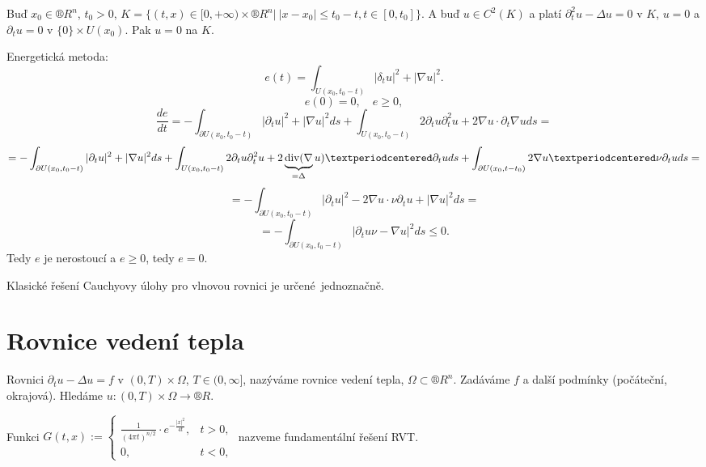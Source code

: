 \documentclass[12pt]{article}					%
\begin{document}

\begin{veta}
	Buď $x_0 \in ®R^n$, $t_0 > 0$, $K = \{(t, x) \in [0, +∞) \times ®R^n |\ |x - x_0| ≤ t_0 - t, t \in [0, t_0]\}$. A buď $u \in C^2(K)$ a platí $\partial_t^2 u - \Delta u = 0$ v $K$, $u = 0$ a $\partial_t u = 0$ v $\{0\} \times U(x_0)$. Pak $u = 0$ na $K$.

	\begin{dukazin}
		Energetická metoda:
		$$ e(t) = \int_{U(x_0, t_0 - t)} |\delta_t u|^2 + |\nabla u|^2. $$
		$$ e(0) = 0, \quad e ≥ 0, $$
		$$ \frac{de}{dt} = - \int_{\partial U(x_0, t_0 - t)}|\partial_t u|^2 + |\nabla u|^2 ds + \int_{U(x_0, t_0 - t)} 2 \partial_t u \partial_t^2 u + 2 \nabla u · \partial_t \nabla u ds = $$
		$$ = - \int_{\partial U(x_0, t_0 - t)}|\partial_t u|^2 + |\nabla u|^2 ds + \int_{U(x_0, t_0 - t)} 2 \partial_t u \partial_t^2 u + 2 \underbrace{\Div(\nabla}_{=\Delta} u) · \partial_t u ds + \int_{\partial U(x_0, t - t_0)} 2 \nabla u·\nu \partial_t u ds = $$
		$$ = - \int_{\partial U(x_0, t_0 - t)}|\partial_t u|^2 - 2\nabla u · \nu \partial_t u + |\nabla u|^2 ds = $$
		$$ = - \int_{\partial U(x_0, t_0 - t)}|\partial_t u \nu - \nabla u|^2 ds ≤ 0. $$
		Tedy $e$ je nerostoucí a $e ≥ 0$, tedy $e = 0$.
	\end{dukazin}
\end{veta}

\begin{dusledek}
	Klasické řešení Cauchyovy úlohy pro vlnovou rovnici je určené jednoznačně.
\end{dusledek}

\section{Rovnice vedení tepla}
\begin{definice}
	Rovnici $\partial_t u - \Delta u = f$ v $(0, T) \times \Omega$, $T \in (0, ∞]$, nazýváme rovnice vedení tepla, $\Omega \subset ®R^n$. Zadáváme $f$ a další podmínky (počáteční, okrajová). Hledáme $u: (0, T) \times \Omega \rightarrow ®R$.
\end{definice}

\begin{definice}
	Funkci $G(t, x) := \begin{cases}\frac{1}{(4\pi t)^{n / 2}}·e^{-\frac{|x|^2}{4t}}, & t > 0,\\0, & t < 0,\end{cases}$ nazveme fundamentální řešení RVT.
\end{definice}
\end{document}
